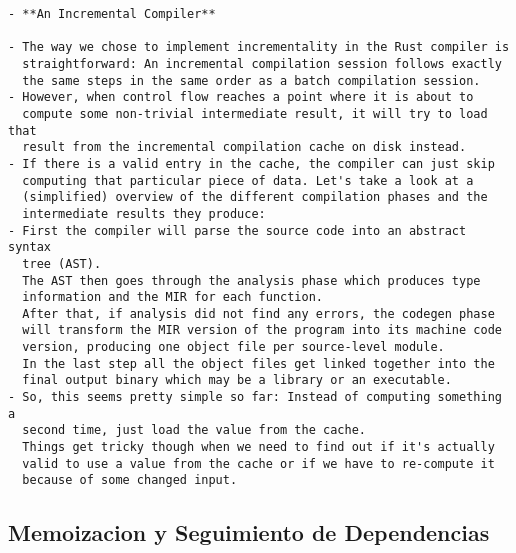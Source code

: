 \documentclass[12pt, a4paper]{report}
\begin{document}
\begin{verbatim}
- **An Incremental Compiler**

- The way we chose to implement incrementality in the Rust compiler is
  straightforward: An incremental compilation session follows exactly
  the same steps in the same order as a batch compilation session.
- However, when control flow reaches a point where it is about to
  compute some non-trivial intermediate result, it will try to load that
  result from the incremental compilation cache on disk instead.
- If there is a valid entry in the cache, the compiler can just skip
  computing that particular piece of data. Let's take a look at a
  (simplified) overview of the different compilation phases and the
  intermediate results they produce:
- First the compiler will parse the source code into an abstract syntax
  tree (AST).
  The AST then goes through the analysis phase which produces type
  information and the MIR for each function.
  After that, if analysis did not find any errors, the codegen phase
  will transform the MIR version of the program into its machine code
  version, producing one object file per source-level module.
  In the last step all the object files get linked together into the
  final output binary which may be a library or an executable.
- So, this seems pretty simple so far: Instead of computing something a
  second time, just load the value from the cache.
  Things get tricky though when we need to find out if it's actually
  valid to use a value from the cache or if we have to re-compute it
  because of some changed input.
\end{verbatim}

\subsection*{Memoizacion y Seguimiento de Dependencias}
\end{document}
